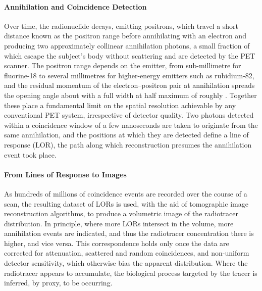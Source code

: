 \paragraph{Annihilation and Coincidence Detection}
Over time, the radionuclide decays, emitting positrons, which travel a short distance known as the positron range before annihilating with an electron and producing two approximately collinear  annihilation photons, a small fraction of which escape the subject's body without scattering and are detected by the PET scanner.
The positron range depends on the emitter, from sub-millimetre for fluorine-18 to several millimetres for higher-energy emitters such as rubidium-82, and the residual momentum of the electron--positron pair at annihilation spreads the opening angle about  with a full width at half maximum of roughly  . Together these place a fundamental limit on the spatial resolution achievable by any conventional PET system, irrespective of detector quality.
Two photons detected within a coincidence window of a few nanoseconds  are taken to originate from the same annihilation, and the positions at which they are detected define a line of response (LOR), the path along which reconstruction presumes the annihilation event took place.

\paragraph{From Lines of Response to Images}
As hundreds of millions of coincidence events are recorded over the course of a scan, the resulting dataset of LORs is used, with the aid of tomographic image reconstruction algorithms, to produce a volumetric image of the radiotracer distribution.
In principle, where more LORs intersect in the volume, more annihilation events are indicated, and thus the radiotracer concentration there is higher, and vice versa. This correspondence holds only once the data are corrected for attenuation, scattered and random coincidences, and non-uniform detector sensitivity, which otherwise bias the apparent distribution.
Where the radiotracer appears to accumulate, the biological process targeted by the tracer is inferred, by proxy, to be occurring.

